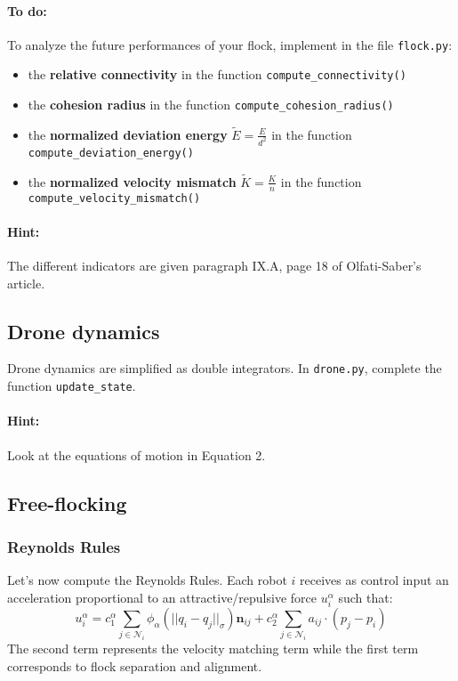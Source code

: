 \documentclass{article}
\begin{document}
\paragraph{To do:}
To analyze the future performances of your flock, implement in the file \texttt{flock.py}:
\begin{itemize}
 \item the \textbf{relative connectivity} in the function \texttt{compute\_connectivity()}
 \item the \textbf{cohesion radius} in the function \texttt{compute\_cohesion\_radius()}
 \item the \textbf{normalized deviation energy} $\widetilde{E} = \frac{E}{d^2}$ in the function \texttt{compute\_deviation\_energy()}
 \item the \textbf{normalized velocity mismatch} $\widetilde{K} = \frac{K}{n}$ in the function \texttt{compute\_velocity\_mismatch()}
\end{itemize}


\paragraph{Hint:} The different indicators are given paragraph IX.A, page 18 of Olfati-Saber's article.

\subsection{Drone dynamics}
Drone dynamics are simplified as double integrators. In \texttt{drone.py}, complete the function \texttt{update\_state}.
\paragraph{Hint:} Look at the equations of motion in Equation 2.

\subsection{Free-flocking}
\subsubsection{Reynolds Rules}
Let's now compute the Reynolds Rules. Each robot $i$ receives as control input an acceleration proportional to an attractive/repulsive force $u_i^\alpha$ such that:
$$
u_i^\alpha = c_1^{\alpha} \sum_{j\in \mathcal{N}_i}\phi_\alpha(||q_i - q_j||_\sigma)\mathbf{n}_{ij} + c_2^{\alpha} \sum_{j\in \mathcal{N}_i}a_{ij}\cdot(p_j-p_i)
$$
The second term represents the velocity matching term while the first term corresponds to flock separation and alignment.
\end{document}
